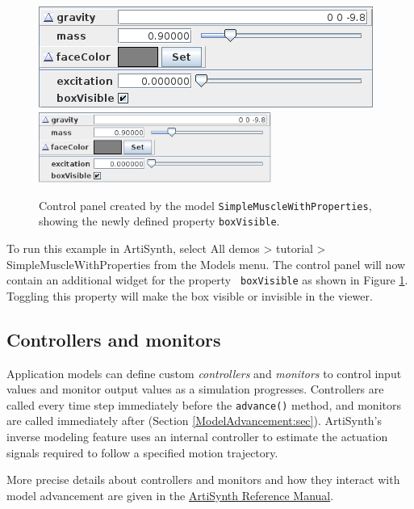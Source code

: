\begin{figure}[t]
\begin{center}
\iflatexml
 \includegraphics[]{images/boxVisiblePanel}
\else
 \includegraphics[width=3in]{images/boxVisiblePanel}
\fi
\end{center}
\caption{Control panel created by the model {\tt SimpleMuscleWithProperties},
showing the newly defined property {\tt boxVisible}.}
\label{boxVisiblePanel:fig}
\end{figure}

To run this example in ArtiSynth, select {\sf All demos > tutorial >
SimpleMuscleWithProperties} from the {\sf Models} menu. The control
panel will now contain an additional widget for the property {\tt
boxVisible} as shown in Figure \ref{boxVisiblePanel:fig}. Toggling
this property will make the box visible or invisible in the viewer.


\subsection{Controllers and monitors}
\label{ControllersAndMonitors:sec}

Application models can define custom {\it controllers} and {\it
monitors} to control input values and monitor output values as a
simulation progresses. Controllers are called every time step
immediately before the {\tt advance()} method, and monitors are called
immediately after (Section \ref{ModelAdvancement:sec}).
ArtiSynth's inverse modeling feature uses an internal controller to
estimate the actuation signals required to follow a specified motion
trajectory.

More precise details about controllers and monitors and how they
interact with model advancement are given in the
\href{http://www.artisynth.org/doc/html/artisynth/artisynth.html}{
ArtiSynth Reference Manual}.

